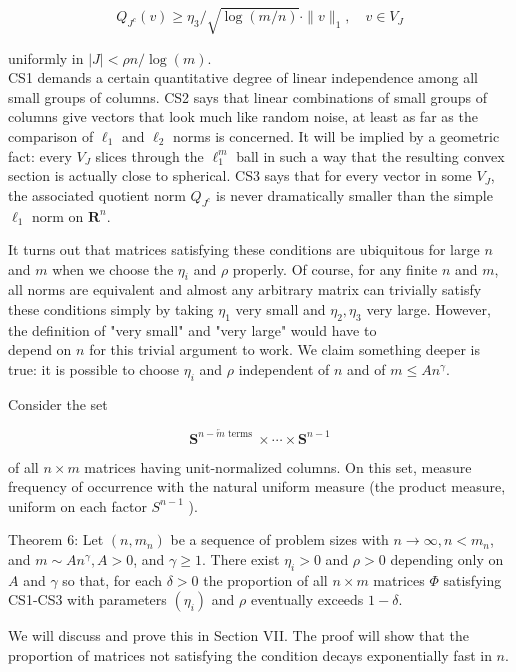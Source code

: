 \documentclass[10pt]{article}
\begin{document}
$$
Q_{J^{c}}(v) \geq \eta_{3} / \sqrt{\log (m / n)} \cdot\|v\|_{1}, \quad v \in V_{J}
$$

uniformly in $|J|<\rho n / \log (m)$.\\
CS1 demands a certain quantitative degree of linear independence among all small groups of columns. CS2 says that linear combinations of small groups of columns give vectors that look much like random noise, at least as far as the comparison of $\ell_{1}$ and $\ell_{2}$ norms is concerned. It will be implied by a geometric fact: every $V_{J}$ slices through the $\ell_{1}^{m}$ ball in such a way that the resulting convex section is actually close to spherical. CS3 says that for every vector in some $V_{J}$, the associated quotient norm $Q_{J^{c}}$ is never dramatically smaller than the simple $\ell_{1}$ norm on $\boldsymbol{R}^{n}$.

It turns out that matrices satisfying these conditions are ubiquitous for large $n$ and $m$ when we choose the $\eta_{i}$ and $\rho$ properly. Of course, for any finite $n$ and $m$, all norms are equivalent and almost any arbitrary matrix can trivially satisfy these conditions simply by taking $\eta_{1}$ very small and $\eta_{2}, \eta_{3}$ very large. However, the definition of "very small" and "very large" would have to\\
depend on $n$ for this trivial argument to work. We claim something deeper is true: it is possible to choose $\eta_{i}$ and $\rho$ independent of $n$ and of $m \leq A n^{\gamma}$.

Consider the set

$$
\boldsymbol{S}^{n-\overleftarrow{m} \text { terms }} \times \cdots \times \boldsymbol{S}^{n-1}
$$

of all $n \times m$ matrices having unit-normalized columns. On this set, measure frequency of occurrence with the natural uniform measure (the product measure, uniform on each factor $S^{n-1}$ ).

Theorem 6: Let $\left(n, m_{n}\right)$ be a sequence of problem sizes with $n \rightarrow \infty, n<m_{n}$, and $m \sim A n^{\gamma}, A>0$, and $\gamma \geq 1$. There exist $\eta_{i}>0$ and $\rho>0$ depending only on $A$ and $\gamma$ so that, for each $\delta>0$ the proportion of all $n \times m$ matrices $\Phi$ satisfying CS1-CS3 with parameters $\left(\eta_{i}\right)$ and $\rho$ eventually exceeds $1-\delta$.

We will discuss and prove this in Section VII. The proof will show that the proportion of matrices not satisfying the condition decays exponentially fast in $n$.
\end{document}
